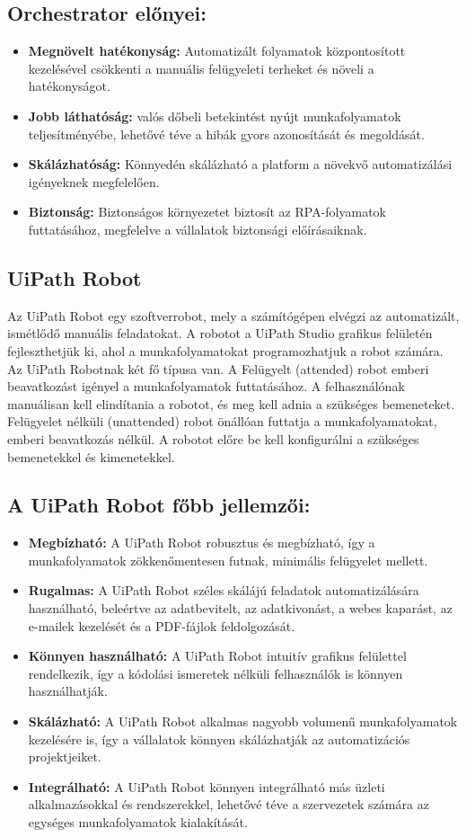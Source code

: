 \documentclass[
]{thesis-ekf}
\theoremstyle{definition}
\theoremstyle{remark}
\begin{document}
\subsection*{Orchestrator előnyei:}
\begin{itemize}
		\item \textbf{Megnövelt hatékonyság:} Automatizált folyamatok központosított kezelésével csökkenti a manuális felügyeleti terheket és növeli a hatékonyságot.
		\item \textbf{Jobb láthatóság:} valós dőbeli betekintést nyújt munkafolyamatok teljesítményébe, lehetővé téve a hibák gyors azonosítását és megoldását.
		\item \textbf{Skálázhatóság:} Könnyedén skálázható a platform a növekvő automatizálási igényeknek megfelelően.
		\item \textbf{Biztonság:}  Biztonságos környezetet biztosít az RPA-folyamatok futtatásához, megfelelve a vállalatok biztonsági előírásaiknak.
\end{itemize}
\subsection{ UiPath Robot}
Az UiPath Robot egy szoftverrobot, mely a számítógépen elvégzi az automatizált, ismétlődő manuális feladatokat.  A robotot a UiPath Studio grafikus felületén fejleszthetjük ki, ahol a munkafolyamatokat programozhatjuk a robot számára. Az UiPath Robotnak két fő típusa van. A Felügyelt (attended) robot emberi beavatkozást igényel a munkafolyamatok futtatásához. A felhasználónak manuálisan kell elindítania a robotot, és meg kell adnia a szükséges bemeneteket. Felügyelet nélküli (unattended) robot önállóan futtatja a munkafolyamatokat, emberi beavatkozás nélkül. A robotot előre be kell konfigurálni a szükséges bemenetekkel és kimenetekkel.

\subsection*{A UiPath Robot főbb jellemzői:}
\begin{itemize}
\item\textbf{ Megbízható:} A UiPath Robot robusztus és megbízható, így a munkafolyamatok zökkenőmentesen futnak, minimális felügyelet mellett.
\item\textbf{Rugalmas:} A UiPath Robot széles skálájú feladatok automatizálására használható, beleértve az adatbevitelt, az adatkivonást, a webes kaparást, az e-mailek kezelését és a PDF-fájlok feldolgozását.
\item \textbf{Könnyen használható:} A UiPath Robot intuitív grafikus felülettel rendelkezik, így a kódolási ismeretek nélküli felhasználók is könnyen használhatják.
\item \textbf{Skálázható:} A UiPath Robot alkalmas nagyobb volumenű munkafolyamatok kezelésére is, így a vállalatok könnyen skálázhatják az automatizációs projektjeiket.
\item \textbf{Integrálható:} A UiPath Robot könnyen integrálható más üzleti alkalmazásokkal és rendszerekkel, lehetővé téve a szervezetek számára az egységes munkafolyamatok kialakítását.
\end{itemize}
\end{document}

